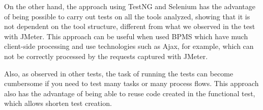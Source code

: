 \documentclass[runningheads,a4paper]{llncs}
\begin{document}
On the other hand, the approach using TestNG and Selenium has the advantage of being possible to carry out tests on all the tools analyzed, showing that it is not dependent on the tool structure, different from what we observed in the test with JMeter. This approach can be useful when used BPMS which have much client-side processing and use technologies such as Ajax, for example, which can not be correctly processed by the requests captured with JMeter.

Also, as observed in other tests, the task of running the tests can become cumbersome if you need to test many tasks or many process flows. This approach also has the advantage of being able to reuse code created in the functional test, which allows shorten test creation.
%
%
%
%
\end{document}
